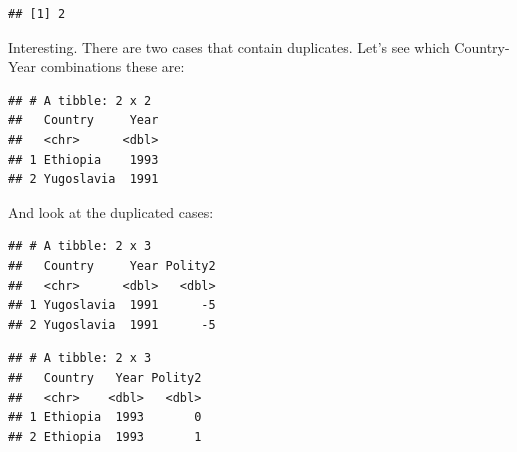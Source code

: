 \documentclass[]{book}
\newenvironment{Shaded}{\begin{snugshade}}{\end{snugshade}}
\newcommand{\DecValTok}[1]{\textcolor[rgb]{0.00,0.00,0.81}{#1}}
\newcommand{\KeywordTok}[1]{\textcolor[rgb]{0.13,0.29,0.53}{\textbf{#1}}}
\newcommand{\NormalTok}[1]{#1}
\newcommand{\OperatorTok}[1]{\textcolor[rgb]{0.81,0.36,0.00}{\textbf{#1}}}
\newcommand{\StringTok}[1]{\textcolor[rgb]{0.31,0.60,0.02}{#1}}
\begin{document}
\begin{verbatim}
## [1] 2
\end{verbatim}

Interesting. There are two cases that contain duplicates. Let's see which Country-Year combinations these are:

\begin{Shaded}
\end{Shaded}

\begin{verbatim}
## # A tibble: 2 x 2
##   Country     Year
##   <chr>      <dbl>
## 1 Ethiopia    1993
## 2 Yugoslavia  1991
\end{verbatim}

And look at the duplicated cases:

\begin{Shaded}
\end{Shaded}

\begin{verbatim}
## # A tibble: 2 x 3
##   Country     Year Polity2
##   <chr>      <dbl>   <dbl>
## 1 Yugoslavia  1991      -5
## 2 Yugoslavia  1991      -5
\end{verbatim}

\begin{Shaded}
\end{Shaded}

\begin{verbatim}
## # A tibble: 2 x 3
##   Country   Year Polity2
##   <chr>    <dbl>   <dbl>
## 1 Ethiopia  1993       0
## 2 Ethiopia  1993       1
\end{verbatim}
\end{document}

